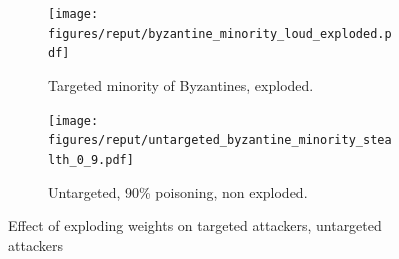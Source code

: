 \begin{figure}[t]
  \centering 
  \begin{subfigure}{0.49\columnwidth}
    \centering 
    \texttt{[image: figures/reput/byzantine\_minority\_loud\_exploded.pdf]}    \caption{Targeted minority of Byzantines, exploded.}
    \label{fig:targeted_byzantine_minority_exploded_reputation}
  \end{subfigure}
   \begin{subfigure}{0.49\columnwidth}
    \centering 
    \texttt{[image: figures/reput/untargeted\_byzantine\_minority\_stealth\_0\_9.pdf]}    
    \caption{Untargeted, 90\% poisoning, non exploded.}
    \label{fig:untargeted_byzantine_minority_non_exploded_reputation}
  \end{subfigure}
  \caption{Effect of exploding weights on targeted attackers, untargeted attackers}
  \label{fig:exploding_weights}
\end{figure}
